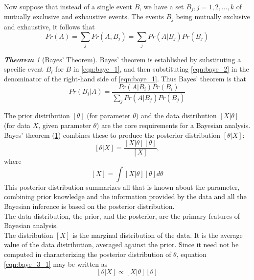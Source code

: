 \documentclass[12pt,oneside,a4paper]{book}
\theoremstyle{definition}
\theoremstyle{remark}
\newtheorem{thm}{\bf Theorem}[subsection]
\begin{document}
				Now suppose that instead of a single event $B$, we have a set $B_j,j = 1,2,. . . ,k$ of mutually exclusive and exhaustive events. The events $B_j$ being mutually exclusive and exhaustive, it follows that
				\begin{equation}\label{eqn:baye_2}
					Pr(A) = \sum_j Pr(A,B_j) = \sum_j Pr(A|B_j) Pr(B_j)
				\end{equation}

				\begin{thm}[Bayes' Theorem]\label{thm:bayestheorem}\cite{link2009bayesian}
					Bayes’ theorem is established by substituting a specific event $B_i$ for $B$ in \eqref{eqn:baye_1}, and then substituting \eqref{eqn:baye_2} in the denominator of the right-hand side of \eqref{eqn:baye_1}. Thus Bayes’ theorem is that	\\
					\begin{equation}
						Pr(B_i|A) = \frac{Pr(A|B_i)Pr(B_i)}{\sum_j Pr(A|B_j) Pr(B_j)}
					\end{equation}
				\end{thm}


				The prior distribution $[\theta]$ (for parameter $\theta$) and the data distribution $[X|\theta]$ (for data $X$, given parameter $\theta$) are the core requirements for a Bayesian analysis. Bayes' theorem (\ref{thm:bayestheorem}) combines these to produce the posterior distribution $[\theta|X]$:
				\begin{equation}\label{eqn:baye_3_1}
					[\theta|X] = \frac{[X|\theta][\theta]}{[X]},
				\end{equation}
				where
				\begin{equation}\label{eqn:baye_3_2}
					[X]=\int [X|\theta][\theta]d\theta
				\end{equation}
				This posterior distribution summarizes all that is known about the parameter, combining prior knowledge and the information provided by the data and all the Bayesian inference is based on the posterior distribution.\\
				The data distribution, the prior, and the posterior, are the primary	features of Bayesian analysis.\\
				The distribution $[X]$ is the marginal distribution of the data. It is the average value of the data distribution, averaged against the prior. Since it need not be computed in characterizing the posterior distribution of $\theta$, equation \eqref{eqn:baye_3_1} may be written as
				\begin{equation}\label{eqn:baye_4}
					[\theta|X] \propto [X|\theta][\theta]
				\end{equation}
\end{document}
